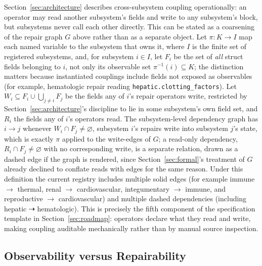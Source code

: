 \documentclass[11pt]{article}
\begin{document}
Section~\ref{sec:architecture} describes cross-subsystem coupling operationally: an operator may read another subsystem's fields and write to any subsystem's block, but subsystems never call each other directly. This can be stated as a coarsening of the repair graph $G$ above rather than as a separate object. Let $\pi : K \rightarrow I$ map each named variable to the subsystem that owns it, where $I$ is the finite set of registered subsystems, and, for subsystem $i \in I$, let $F_i$ be the set of \emph{all} struct fields belonging to $i$, not only its observable set $\pi^{-1}(i) \subseteq K$; the distinction matters because instantiated couplings include fields not exposed as observables (for example, hematologic repair reading \texttt{hepatic.clotting\_factors}). Let $W_i \subseteq F_i \cup \bigcup_{j \neq i} F_j$ be the fields any of $i$'s repair operators write, restricted by Section~\ref{sec:architecture}'s discipline to lie in some subsystem's own field set, and $R_i$ the fields any of $i$'s operators read. The subsystem-level dependency graph has $i \rightarrow j$ whenever $W_i \cap F_j \neq \varnothing$, subsystem $i$'s repairs write into subsystem $j$'s state, which is exactly $\pi$ applied to the write-edges of $G$; a read-only dependency, $R_i \cap F_j \neq \varnothing$ with no corresponding write, is a separate relation, drawn as a dashed edge if the graph is rendered, since Section~\ref{sec:formal}'s treatment of $G$ already declined to conflate reads with edges for the same reason. Under this definition the current registry includes multiple solid edges (for example immune $\rightarrow$ thermal, renal $\rightarrow$ cardiovascular, integumentary $\rightarrow$ immune, and reproductive $\rightarrow$ cardiovascular) and multiple dashed dependencies (including hepatic $\dashrightarrow$ hematologic). This is precisely the fifth component of the specification template in Section~\ref{sec:roadmap}: operators declare what they read and write, making coupling auditable mechanically rather than by manual source inspection.

\subsection{Observability versus Repairability}
\end{document}
